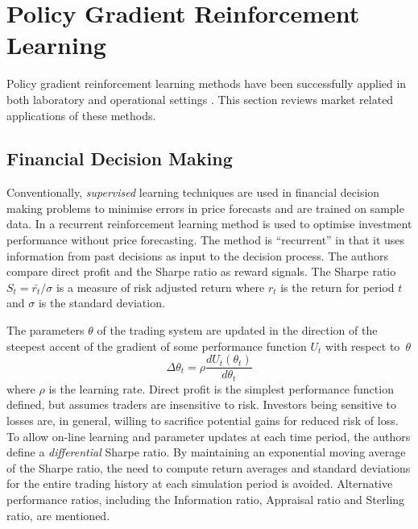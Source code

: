 \section{Policy Gradient Reinforcement Learning}
Policy gradient reinforcement learning methods have been successfully applied in
both laboratory and operational settings
\cite{barto:policy,shaal:robots,peshkin:routing}.  This section reviews market
related applications of these methods.

\subsection{Financial Decision Making}
\label{sec:moody}
Conventionally, \textit{supervised} learning techniques are used in financial
decision making problems to minimise errors in price forecasts and are trained
on sample data.  In  a recurrent reinforcement learning method
is used to optimise investment performance without price forecasting. The method
is ``recurrent'' in that it uses information from past decisions as input to the
decision process.  The authors compare direct profit and the Sharpe ratio
\cite{sharpe:ratio66,sharpe:ratio94} as reward signals. The Sharpe ratio $S_t =
\bar{r_t} / \sigma$ is a measure of risk adjusted return
where $r_t$ is the return for period $t$ and $\sigma$ is the standard deviation.

The parameters $\theta$ of the trading system are updated in the direction of
the steepest accent of the gradient of some performance function $U_t$ with
respect to~$\theta$
\begin{equation}
\Delta\theta_t = \rho \frac{dU_t(\theta_t)}{d\theta_t}
\end{equation}
where $\rho$ is the learning rate.  Direct profit is the simplest performance
function defined, but assumes traders are insensitive to risk.  Investors
being sensitive to losses are, in general, willing to sacrifice potential gains
for reduced risk of loss. To allow on-line learning and parameter updates at
each time period, the authors define a \textit{differential} Sharpe ratio.  By
maintaining an exponential moving average of the Sharpe ratio, the need to
compute return averages and standard deviations for the entire trading history
at each simulation period is avoided.  Alternative performance ratios,
including the Information ratio, Appraisal ratio and Sterling ratio, are
mentioned.

